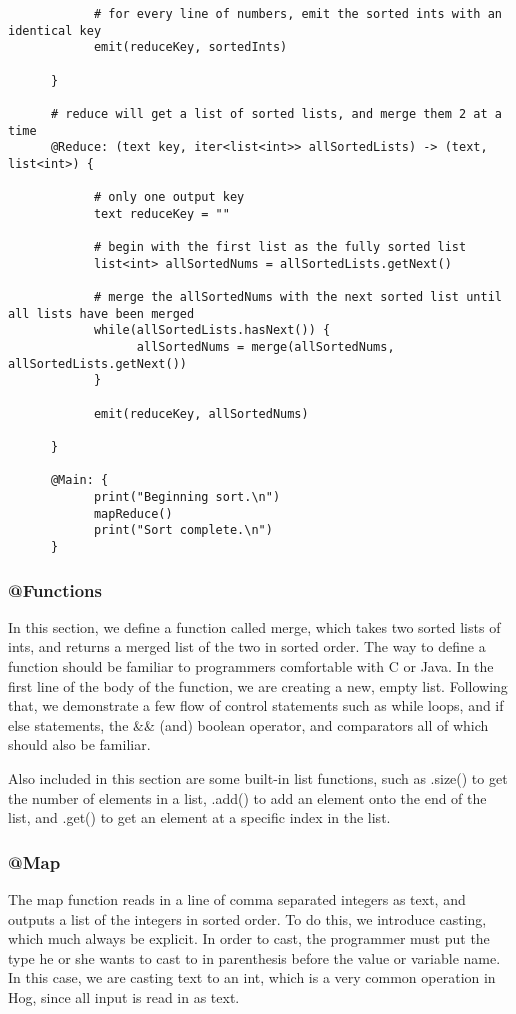 \documentclass{article} \usepackage{fancyhdr, multicol}
\begin{document}
\begin{verbatim}
            # for every line of numbers, emit the sorted ints with an identical key
            emit(reduceKey, sortedInts)
      
      }
      
      # reduce will get a list of sorted lists, and merge them 2 at a time
      @Reduce: (text key, iter<list<int>> allSortedLists) -> (text, list<int>) {
            
            # only one output key
            text reduceKey = ""
            
            # begin with the first list as the fully sorted list 
            list<int> allSortedNums = allSortedLists.getNext()
            
            # merge the allSortedNums with the next sorted list until all lists have been merged
            while(allSortedLists.hasNext()) {
                  allSortedNums = merge(allSortedNums, allSortedLists.getNext())
            }
            
            emit(reduceKey, allSortedNums)
            
      }
      
      @Main: {
            print("Beginning sort.\n")
            mapReduce()
            print("Sort complete.\n")
      }

\end{verbatim}

\subsubsection*{@Functions}
In this section, we define a function called merge, which takes two sorted lists of ints, and returns a merged list of the two in sorted order. The way to define a function should be familiar to programmers comfortable with C or Java. In the first line of the body of the function, we are creating a new, empty list. Following that, we demonstrate a few flow of control statements such as while loops, and if else statements, the \&\& (and) boolean operator, and comparators all of which should also be familiar. 

Also included in this section are some built-in list functions, such as .size() to get the number of elements in a list, .add() to add an element onto the end of the list, and .get() to get an element at a specific index in the list.

\subsubsection*{@Map}
The map function reads in a line of comma separated integers as text, and outputs a list of the integers in sorted order. To do this, we introduce casting, which much always be explicit. In order to cast, the programmer must put the type he or she wants to cast to in parenthesis before the value or variable name. In this case, we are casting text to an int, which is a very common operation in Hog, since all input is read in as text.
\end{document}

